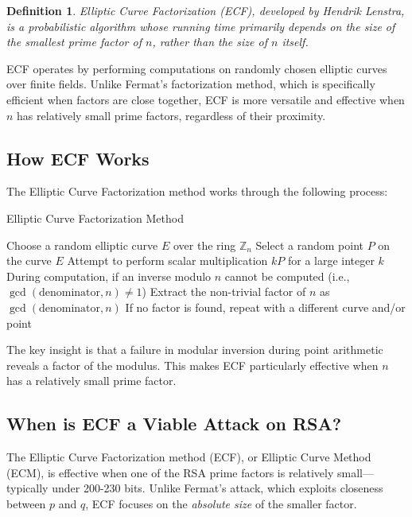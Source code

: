 \documentclass{article}
\newtheorem{definition}{Definition}
\begin{document}
\begin{definition}
    Elliptic Curve Factorization (ECF), developed by Hendrik Lenstra, is a probabilistic algorithm whose running time primarily depends on the size of the smallest prime factor of $n$, rather than the size of $n$ itself.
\end{definition}

ECF operates by performing computations on randomly chosen elliptic curves over finite fields. Unlike Fermat's factorization method, which is specifically efficient when factors are close together, ECF is more versatile and effective when $n$ has relatively small prime factors, regardless of their proximity.

\subsection*{How ECF Works}

The Elliptic Curve Factorization method works through the following process:

\begin{algorithm}
    \caption{Elliptic Curve Factorization Method}
    \begin{algorithmic}[1]
        \State Choose a random elliptic curve $E$ over the ring $\mathbb{Z}_n$
        \State Select a random point $P$ on the curve $E$
        \State Attempt to perform scalar multiplication $kP$ for a large integer $k$
        \State During computation, if an inverse modulo $n$ cannot be computed (i.e., $\gcd(\text{denominator}, n) \neq 1$)
        \State Extract the non-trivial factor of $n$ as $\gcd(\text{denominator}, n)$
        \State If no factor is found, repeat with a different curve and/or point
    \end{algorithmic}
\end{algorithm}

The key insight is that a failure in modular inversion during point arithmetic reveals a factor of the modulus. This makes ECF particularly effective when $n$ has a relatively small prime factor.

\subsection*{When is ECF a Viable Attack on RSA?}

The Elliptic Curve Factorization method (ECF), or Elliptic Curve Method (ECM), is effective when one of the RSA prime factors is relatively small—typically under 200-230 bits. Unlike Fermat's attack, which exploits closeness between \( p \) and \( q \), ECF focuses on the \emph{absolute size} of the smaller factor.
\end{document}
